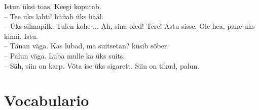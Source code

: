 \noindent
Istun üksi toas. Keegi koputab. \\
-- Tee uks lahti! hüüab üks hääl. \\
-- Üks silmapilk. Tulen kohe ... Ah, sina oled! Tere! Astu sisse. Ole hea, pane uks kinni. Istu. \\
-- Tänan väga. Kas lubad, ma suitsetan? küsib sõber. \\
-- Palun väga. Luba mulle ka üks suits. \\
-- Säh, siin on karp. Võta ise üks sigarett. Siin on tikud, palun. 

\bigskip
\Large{\section*{Vocabulario}}


